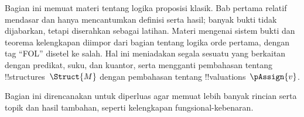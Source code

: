 \documentclass[../../include/open-logic-part]{subfiles}
\begin{document}

\begin{editorial}
  Bagian ini memuat materi tentang logika proposisi klasik. Bab
  pertama relatif mendasar dan hanya mencantumkan definisi serta
  hasil; banyak bukti tidak dijabarkan, tetapi diserahkan sebagai
  latihan. Materi mengenai sistem bukti dan teorema kelengkapan
  diimpor dari bagian tentang logika orde pertama, dengan tag
  ``FOL'' disetel ke salah. Hal ini meniadakan segala sesuatu yang
  berkaitan dengan predikat, suku, dan kuantor, serta mengganti
  pembahasan tentang !!{structure}s~$\Struct{M}$ dengan pembahasan
  tentang !!{valuation}s~$\pAssign{v}$.

  Bagian ini direncanakan untuk diperluas agar memuat lebih banyak
  rincian serta topik dan hasil tambahan, seperti kelengkapan
  fungsional-kebenaran.
\end{editorial}










\OLEndPartHook
\end{document}
